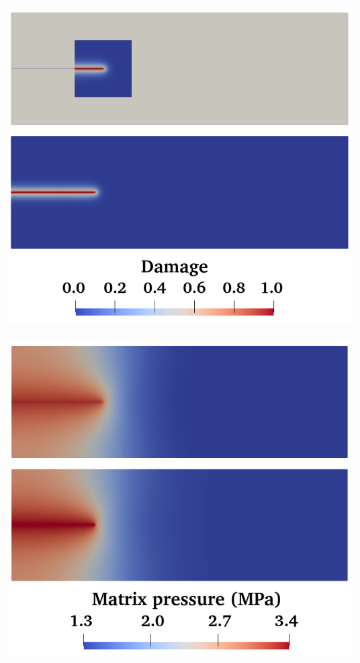 \medskip

\begin{figure}
\centering
\vspace{-\abovedisplayskip}
\begin{subfigure}{.5\textwidth}
  \centering
  \includegraphics[width=\linewidth]{img/comparison_prob/damage_fields.png}
  \caption{}
  \label{fig:damage_snapshot_p2}
\end{subfigure}%
\begin{subfigure}{.5\textwidth}
  \centering
  \includegraphics[width=\linewidth]{img/comparison_prob/pressure_fields.png}

\end{subfigure}
\end{figure}
